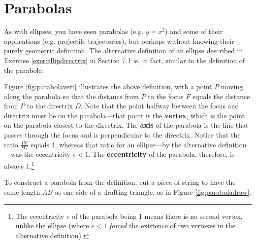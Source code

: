 \section{Parabolas}
As with ellipses, you have seen parabolas (e.g. $y=x^2$) and some of their
applications (e.g. projectile trajectories), but perhaps without knowing their
purely geometric definition. The alternative definition of an ellipse described
in Exercise \ref{exer:ellipdirectrix} in Section 7.1 is, in fact, similar to the
definition of the parabola:


Figure \ref{fig:parabolavert} illustrates the above definition, with a point $P$
moving along the parabola so that the distance from $P$ to the focus $F$ equals
the distance from $P$ to the directrix $D$. Note that the point halfway between
the focus and directrix must be on the parabola---that point is the
\textbf{vertex}, which is the point on the parabola
closest to the directrix. The \textbf{axis} of the parabola is the line that
passes through the focus and is perpendicular to the directrix. Notice that the
ratio $\frac{PF}{PG}$ equals 1, whereas that ratio for an ellipse---by the
alternative definition---was the eccentricity $e<1$. The
\textbf{eccentricity} of the parabola, therefore,
is always 1.\footnote{The eccentricity $e$ of the parabola being 1 means there
is no second vertex, unlike the ellipse (where $e<1$ \emph{forced} the existence
of two vertexes in the alternative definition).}

To construct a parabola from the definition, cut a piece of string to have the
same length $AB$ as one side of a drafting triangle, as in Figure
\ref{fig:paraboladraw}.

